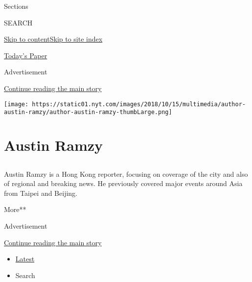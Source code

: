 Sections

SEARCH

\protect\hyperlink{site-content}{Skip to
content}\protect\hyperlink{site-index}{Skip to site index}

\href{https://myaccount.nytimes.com/auth/login?response_type=cookie\&client_id=vi}{}

\href{https://www.nytimes.com/section/todayspaper}{Today's Paper}

Advertisement

\protect\hyperlink{after-top}{Continue reading the main story}

\texttt{[image: https://static01.nyt.com/images/2018/10/15/multimedia/author-austin-ramzy/author-austin-ramzy-thumbLarge.png]}

\hypertarget{austin-ramzy}{%
\section{Austin Ramzy}\label{austin-ramzy}}

\subsection{}

Austin Ramzy is a Hong Kong reporter, focusing on coverage of the city
and also of regional and breaking news. He previously covered major
events around Asia from Taipei and Beijing.

More**

Advertisement

\protect\hyperlink{after-mid1}{Continue reading the main story}

\begin{itemize}
\tightlist
\item
  \protect\hyperlink{stream-panel}{Latest}
\item
  Search
\end{itemize}

